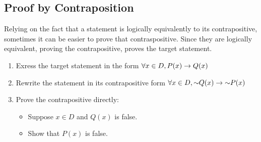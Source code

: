 \documentclass{report}
\begin{document}
\subsection*{Proof by Contraposition}
Relying on the fact that a statement is logically equivalently to its contrapositive, sometimes it can be easier to prove that contraspositive. Since they are logically equivalent, proving the contrapositive, proves the target statement.
\begin{enumerate}
	\item Exress the target statement in the form $\forall x\in D, P(x)\rightarrow Q(x)$
	\item Rewrite the statement in its contrapositive form $\forall x\in D, \mathord{\sim} Q(x)\rightarrow\mathord{\sim} P(x)$
	\item Prove the contrapositive directly:
	\begin{itemize}
		\item Suppose $x\in D$ and $Q(x)$ is false.
		\item Show that $P(x)$ is false.
	\end{itemize}
\end{enumerate}

\end{document}
